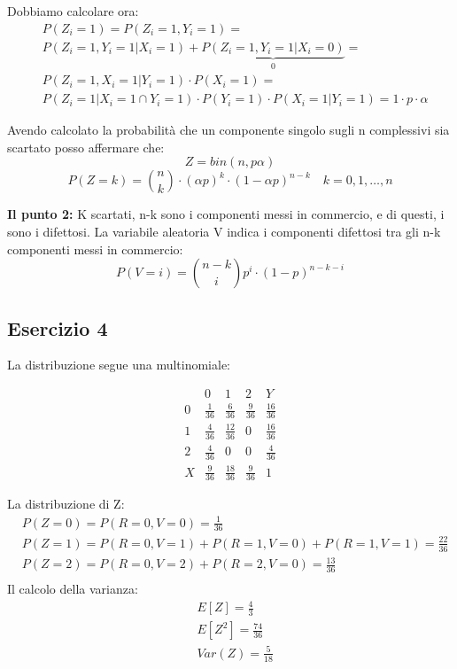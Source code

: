 \documentclass[12pt]{article}
\begin{document}
Dobbiamo calcolare ora:
\begin{align*}
    &P(Z_i = 1) = P(Z_i = 1, Y_i = 1) = \\
    &P(Z_i = 1, Y_i = 1 | X_i = 1) + \underbrace{P(Z_i = 1, Y_i = 1 | X_i=0)}_{0} = \\
    &P(Z_i = 1, X_i = 1 | Y_i = 1)\cdot P(X_i = 1) = \\
    &P(Z_i = 1 | X_i = 1 \cap Y_i = 1)\cdot P(Y_i = 1) \cdot P(X_i = 1 | Y_i = 1) = 1\cdot p \cdot \alpha
\end{align*}

Avendo calcolato la probabilità che un componente singolo sugli n complessivi sia scartato posso affermare che:
\[
Z = bin(n,p\alpha)     
\]
\[
P(Z = k) = \binom{n}{k}\cdot (\alpha p)^k \cdot (1-\alpha p)^{n-k} \quad k = 0,1,\dots, n   
\]

{\bf{Il punto 2:}}  \newline
K scartati, n-k sono i componenti messi in commercio, e di questi, i sono i difettosi.
La variabile aleatoria V indica i componenti difettosi tra gli n-k componenti messi in commercio:
\[
P(V = i) = \binom{n-k}{i} p^i \cdot (1-p)^{n-k-i}    
\]
\subsection*{Esercizio 4}

La distribuzione segue una multinomiale:

\begin{equation*}
    \renewcommand{\arraystretch}{1.5}
    \begin{array}{c|ccc|c}
          & 0 & 1 & 2 & Y\\
    \hline
    0 & \frac{1}{36} & \frac{6}{36} & \frac{9}{36} & \frac{16}{36}\\
    1 & \frac{4}{36} & \frac{12}{36} & 0 & \frac{16}{36} \\
    2 & \frac{4}{36} & 0 & 0  & \frac{4}{36}\\ 
    \hline
    X & \frac{9}{36} & \frac{18}{36} & \frac{9}{36} & 1 
    \end{array}
\end{equation*}

La distribuzione di Z:
\begin{align*}
    &P(Z=0) = P(R=0,V=0) = \frac{1}{36} \\
    &P(Z=1) = P(R=0,V=1) + P(R=1,V=0) + P(R=1,V=1) = \frac{22}{36} \\
    &P(Z=2) = P(R=0,V=2) + P(R=2,V=0)  = \frac{13}{36} \\
\end{align*}
Il calcolo della varianza:
\begin{align*}
    &E[Z] = \frac{4}{3} \\
    &E[Z^2] = \frac{74}{36} \\
    &Var(Z) = \frac{5}{18}    
\end{align*}
    
\end{document}
